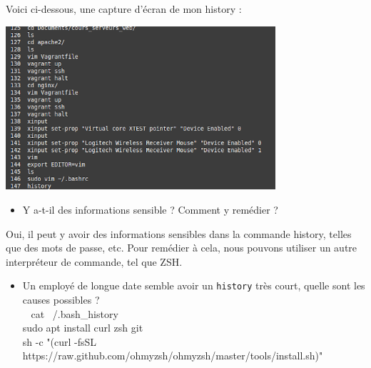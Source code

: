 \documentclass[12pt]{article}
\begin{document}
\vspace{0.3cm}

Voici ci-dessous, une capture d'écran de mon history : 

\begin{center}
  \includegraphics[width=10cm]{Images-TD-Env-Efficiency/Image-TD-4/history.png}
\end{center}

\vspace{0.3cm}

\begin{itemize}
  \item Y a-t-il des informations sensible ? Comment y remédier ?
\end{itemize}

\vspace{0.3cm}

Oui, il peut y avoir des informations sensibles dans la commande history, telles que des mots de passe, etc. Pour remédier à cela, nous pouvons utiliser un autre interpréteur de commande, tel que ZSH.

\vspace{0.3cm}

\begin{itemize}
  \item Un employé de longue date semble avoir un \texttt{history} très court, quelle sont les causes possibles ?\\
  \vspace{0.3cm}
  ~ cat ~/.bash\_history\\
  \vspace{0.3cm}
  sudo apt install curl zsh git\\
  \vspace{0.3cm}
  sh -c "(curl -fsSL https://raw.github.com/ohmyzsh/ohmyzsh/master/tools/install.sh)" 
\end{itemize}

\vspace{0.3cm}
\end{document}
